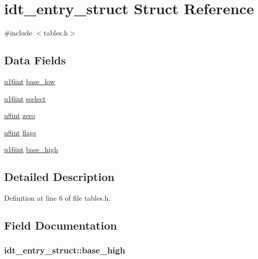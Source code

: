 \hypertarget{structidt__entry__struct}{}\section{idt\+\_\+entry\+\_\+struct Struct Reference}
\label{structidt__entry__struct}


{\ttfamily \#include $<$tables.\+h$>$}

\subsection*{Data Fields}
\begin{DoxyCompactItemize}
\item 
\hyperlink{system_8h_a863d9497073aad2b991aeab2211d87af}{u16int} \hyperlink{structidt__entry__struct_aefa75d6bfe07f1f544393b4dbccb3e76}{base\+\_\+low}
\item 
\hyperlink{system_8h_a863d9497073aad2b991aeab2211d87af}{u16int} \hyperlink{structidt__entry__struct_a85254c7df6a612f4a4b3bb470ff3370c}{sselect}
\item 
\hyperlink{system_8h_a1026e682ffdadc1701c42cd44ce9efcf}{u8int} \hyperlink{structidt__entry__struct_a0d33c8509ae77d42e680d8d11b4c8035}{zero}
\item 
\hyperlink{system_8h_a1026e682ffdadc1701c42cd44ce9efcf}{u8int} \hyperlink{structidt__entry__struct_a46c92bd8f07d5ff4e379a07b293c46af}{flags}
\item 
\hyperlink{system_8h_a863d9497073aad2b991aeab2211d87af}{u16int} \hyperlink{structidt__entry__struct_a1c6a29cae5ea9a832cf4261aaa5b43d0}{base\+\_\+high}
\end{DoxyCompactItemize}


\subsection{Detailed Description}


Definition at line 6 of file tables.\+h.



\subsection{Field Documentation}
\subsubsection[{\texorpdfstring{base\+\_\+high}{base_high}}]{ idt\+\_\+entry\+\_\+struct\+::base\+\_\+high}\hypertarget{structidt__entry__struct_a1c6a29cae5ea9a832cf4261aaa5b43d0}{}\label{structidt__entry__struct_a1c6a29cae5ea9a832cf4261aaa5b43d0}



